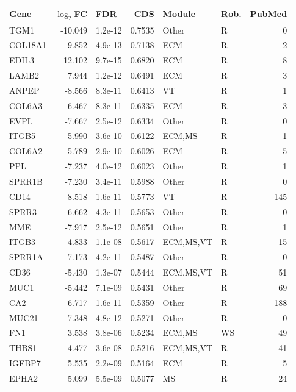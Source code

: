 \begin{table}[ht]
\centering
\begin{tabular}{lrlrllr}
  \hline
Gene & $\log_2$FC & FDR & CDS & Module & Rob. & PubMed \\ 
  \hline
TGM1 & -10.049 & 1.2e-12 & 0.7535 & Other & R & 0 \\ 
  COL18A1 & 9.852 & 4.9e-13 & 0.7138 & ECM & R & 2 \\ 
  EDIL3 & 12.102 & 9.7e-15 & 0.6820 & ECM & R & 8 \\ 
  LAMB2 & 7.944 & 1.2e-12 & 0.6491 & ECM & R & 3 \\ 
  ANPEP & -8.566 & 8.3e-11 & 0.6413 & VT & R & 1 \\ 
  COL6A3 & 6.467 & 8.3e-11 & 0.6335 & ECM & R & 3 \\ 
  EVPL & -7.667 & 2.5e-12 & 0.6334 & Other & R & 0 \\ 
  ITGB5 & 5.990 & 3.6e-10 & 0.6122 & ECM,MS & R & 1 \\ 
  COL6A2 & 5.789 & 2.9e-10 & 0.6026 & ECM & R & 5 \\ 
  PPL & -7.237 & 4.0e-12 & 0.6023 & Other & R & 1 \\ 
  SPRR1B & -7.230 & 3.4e-11 & 0.5988 & Other & R & 0 \\ 
  CD14 & -8.518 & 1.6e-11 & 0.5773 & VT & R & 145 \\ 
  SPRR3 & -6.662 & 4.3e-11 & 0.5653 & Other & R & 0 \\ 
  MME & -7.917 & 2.5e-12 & 0.5651 & Other & R & 1 \\ 
  ITGB3 & 4.833 & 1.1e-08 & 0.5617 & ECM,MS,VT & R & 15 \\ 
  SPRR1A & -7.173 & 4.2e-11 & 0.5487 & Other & R & 0 \\ 
  CD36 & -5.430 & 1.3e-07 & 0.5444 & ECM,MS,VT & R & 51 \\ 
  MUC1 & -5.442 & 7.1e-09 & 0.5431 & Other & R & 69 \\ 
  CA2 & -6.717 & 1.6e-11 & 0.5359 & Other & R & 188 \\ 
  MUC21 & -7.348 & 4.8e-12 & 0.5271 & Other & R & 0 \\ 
  FN1 & 3.538 & 3.8e-06 & 0.5234 & ECM,MS & WS & 49 \\ 
  THBS1 & 4.477 & 3.6e-08 & 0.5216 & ECM,MS,VT & R & 41 \\ 
  IGFBP7 & 5.535 & 2.2e-09 & 0.5164 & ECM & R & 5 \\ 
  EPHA2 & 5.099 & 5.5e-09 & 0.5077 & MS & R & 24 \\ 

\end{tabular}
\end{table}

